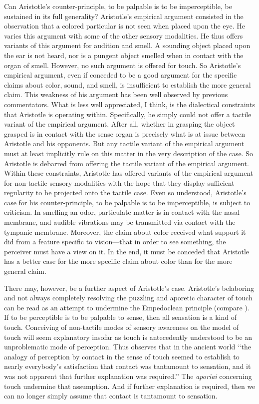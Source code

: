 Can Aristotle's counter-principle, to be palpable is to be imperceptible, be sustained in its full generality? Aristotle's empirical argument consisted in the observation that a colored particular is not seen when placed upon the eye. He varies this argument with some of the other sensory modalities. He thus offers variants of this argument for audition and smell. A sounding object placed upon the ear is not heard, nor is a pungent object smelled when in contact with the organ of smell. However, no such argument is offered for touch. So Aristotle's empirical argument, even if conceded to be a good argument for the specific claims about color, sound, and smell, is insufficient to establish the more general claim. This weakness of his argument has been well observed by previous commentators. What is less well appreciated, I think, is the dialectical constraints that Aristotle is operating within. Specifically, he simply could not offer a tactile variant of the empirical argument. After all, whether in grasping the object grasped is in contact with the sense organ is precisely what is at issue between Aristotle and his opponents. But any tactile variant of the empirical  argument must at least implicitly rule on this matter in the very description of the case. So Aristotle is debarred from offering the tactile variant of the empirical argument. Within these constraints, Aristotle has offered variants of the empirical argument for non-tactile sensory modalities with the hope that they display sufficient regularity to be projected onto the tactile case. Even so understood, Aristotle's case for his counter-principle, to be palpable is to be imperceptible, is subject to criticism. In smelling an odor, particulate matter is in contact with the nasal membrane, and audible vibrations may be transmitted via contact with the tympanic membrane. Moreover, the claim about color received what support it did from a feature specific to vision---that in order to see something, the perceiver must have a view on it. In the end, it must be conceded that Aristotle has a better case for the more specific claim about color than for the more general claim.

There may, however, be a further aspect of Aristotle's case. Aristotle's belaboring and not always completely resolving the puzzling and aporetic character of touch can be read as an attempt to undermine the Empedoclean principle (compare \citealt[``When our eyes touch \ldots'']{Derrida:2005aa}). If to be perceptible is to be palpable to sense, then all sensation is a kind of touch. Conceiving of non-tactile modes of sensory awareness on the model of touch will seem explanatory insofar as touch is antecedently understood to be an unproblematic mode of perception. Thus \citet[39]{Lindberg:1977aa} observes that in the ancient world ‘‘the analogy of perception by contact in the sense of touch seemed to establish to nearly everybody’s satisfaction that contact was tantamount to sensation, and it was not apparent that further explanation was required.’’ The \emph{aporiai} concerning touch undermine that assumption. And if further explanation is required, then we can no longer simply assume that contact is tantamount to sensation.

